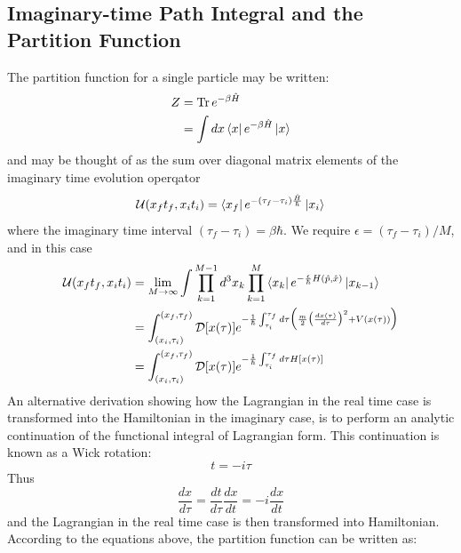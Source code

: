 \documentclass[12pt]{article}
\begin{document}
\subsection*{Imaginary-time Path Integral and the Partition Function}
The partition function for a single particle may be written:
\begin{equation*}
    \begin{split}
        Z&=\Tr e^{-\beta\hat{H}}\\
        &=\int dx\bra{x}e^{-\beta\hat{H}}\ket{x}
    \end{split}
\end{equation*}
and may be thought of as the sum over diagonal matrix elements of the imaginary 
time evolution operqator
\begin{equation*}
    \mathcal{U}(x_ft_f,x_it_i)=\bra{x_f}e^{-(\tau_f-\tau_i)\frac{\hat{H}}{\hbar}}\ket{x_i}
\end{equation*}
where the imaginary time interval $(\tau_f-\tau_i)=\beta\hbar$. We require 
$\epsilon=(\tau_f-\tau_i)/M$, and in this case 
\begin{equation*}
    \begin{split}
        \mathcal{U}(x_ft_f,x_it_i)&=\lim_{M\rightarrow\infty}\int\prod_{k=1}^{M-1}
        d^3x_k\prod_{k=1}^M\bra{x_k}e^{-\frac{\epsilon}{\hbar}H(\hat{p},\hat{x})}
        \ket{x_{k-1}}\\
        &=\int_{(x_i,\tau_i)}^{(x_f,\tau_f)}\mathcal{D}[x(\tau)]e^{-\frac{1}{\hbar}\int_{\tau_i}^{\tau_f}d\tau
        \Big(\frac{m}{2}\big(\frac{dx(\tau)}{d\tau}\big)^2+V(x(\tau))\Big)}\\
        &=\int_{(x_i,\tau_i)}^{(x_f,\tau_f)}\mathcal{D}[x(\tau)]e^{-\frac{1}{\hbar}\int_{\tau_i}^{\tau_f}d\tau
        H[x(\tau)]}
    \end{split}
\end{equation*}
An alternative derivation showing how the Lagrangian in the real time case is 
transformed into the Hamiltonian in the imaginary case, is to perform an analytic  
continuation of the functional integral of Lagrangian form. This continuation is 
known as a Wick rotation:
\begin{equation*}
    t=-i\tau
\end{equation*}
Thus
\begin{equation*}
    \frac{dx}{d\tau}=\frac{dt}{d\tau}\frac{dx}{dt}=-i\frac{dx}{dt}
\end{equation*}
and the Lagrangian in the real time case is then transformed into Hamiltonian. 
According to the equations above, the partition function can be written as:
\end{document}
